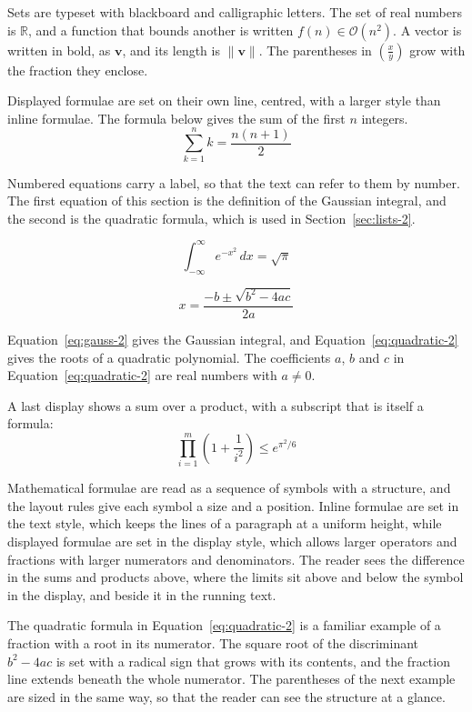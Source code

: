 \documentclass{article}
\begin{document}
Sets are typeset with blackboard and calligraphic letters. The set of real numbers is
$\mathbb{R}$, and a function that bounds another is written $f(n) \in \mathcal{O}(n^2)$.
A vector is written in bold, as $\mathbf{v}$, and its length is $\|\mathbf{v}\|$. The
parentheses in $\left( \frac{x}{y} \right)$ grow with the fraction they enclose.

Displayed formulae are set on their own line, centred, with a larger style than inline
formulae. The formula below gives the sum of the first $n$ integers.
\[
  \sum_{k=1}^{n} k = \frac{n(n+1)}{2}
\]

Numbered equations carry a label, so that the text can refer to them by number. The
first equation of this section is the definition of the Gaussian integral, and the
second is the quadratic formula, which is used in Section~\ref{sec:lists-2}.

\begin{equation}\label{eq:gauss-2}
  \int_{-\infty}^{\infty} e^{-x^{2}}\,dx = \sqrt{\pi}
\end{equation}

\begin{equation}\label{eq:quadratic-2}
  x = \frac{-b \pm \sqrt{b^{2}-4ac}}{2a}
\end{equation}

Equation~\ref{eq:gauss-2} gives the Gaussian integral, and
Equation~\ref{eq:quadratic-2} gives the roots of a quadratic polynomial. The coefficients
$a$, $b$ and $c$ in Equation~\ref{eq:quadratic-2} are real numbers with $a \neq 0$.

A last display shows a sum over a product, with a subscript that is itself a formula:
\[
  \prod_{i=1}^{m} \left( 1 + \frac{1}{i^{2}} \right) \leq e^{\pi^{2}/6}
\]

Mathematical formulae are read as a sequence of symbols with a structure, and the layout
rules give each symbol a size and a position. Inline formulae are set in the text style,
which keeps the lines of a paragraph at a uniform height, while displayed formulae are
set in the display style, which allows larger operators and fractions with larger
numerators and denominators. The reader sees the difference in the sums and products
above, where the limits sit above and below the symbol in the display, and beside it in
the running text.

The quadratic formula in Equation~\ref{eq:quadratic-2} is a familiar example of a
fraction with a root in its numerator. The square root of the discriminant
$b^{2}-4ac$ is set with a radical sign that grows with its contents, and the
fraction line extends beneath the whole numerator. The parentheses of the next example
are sized in the same way, so that the reader can see the structure at a glance.
\end{document}
